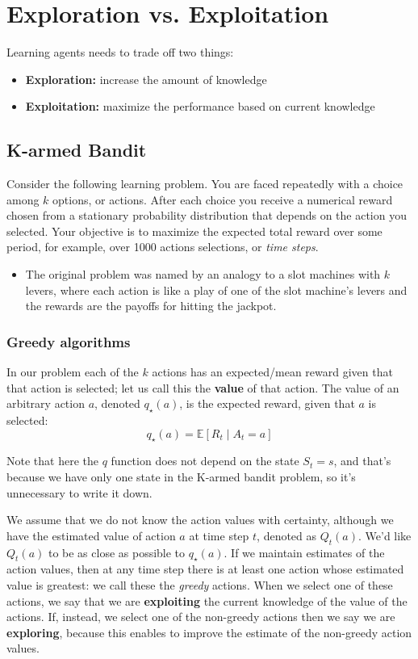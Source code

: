 \section{Exploration vs. Exploitation}
Learning agents needs to trade off two things:
\begin{itemize}
    \item \textbf{Exploration:} increase the amount of knowledge
    \item \textbf{Exploitation:} maximize the performance based on current knowledge
\end{itemize}

\subsection{K-armed Bandit}
Consider the following learning problem. You are faced repeatedly with a choice among $k$ options, or actions. After each choice you receive a numerical reward chosen from a stationary probability distribution that depends on the action you selected. Your objective is to maximize the expected total reward over some period, for example, over 1000 actions selections, or \textit{time steps}.
\begin{itemize}
    \item The original problem was named by an analogy to a slot machines with $k$ levers, where each action is like a play of one of the slot machine's levers and the rewards are the payoffs for hitting the jackpot.
\end{itemize}

\subsubsection{Greedy algorithms}\label{lab:greedy_algorithms}

In our problem each of the $k$ actions has an expected/mean reward given that that action is selected; let us call this the \textbf{value} of that action. The value of an arbitrary action $a$, denoted $q_\star (a)$, is the expected reward, given that $a$ is selected:
\[ 
    q_\star (a) = \mathbb{E}[R_t \mid A_t=a]
\]

Note that here the $q$ function does not depend on the state $S_t=s$, and that's because we have only one state in the K-armed bandit problem, so it's unnecessary to write it down.

We assume that we do not know the action values with certainty, although we have the estimated value of action $a$ at time step $t$, denoted as $Q_t(a)$. We'd like $Q_t(a)$ to be as close as possible to $q_\star (a)$. If we maintain estimates of the action values, then at any time step there is at least one action whose estimated value is greatest: we call these the \emph{greedy} actions. When we select one of these actions, we say that we are \textbf{exploiting} the current knowledge of the value of the actions. If, instead, we select one of the non-greedy actions then we say we are \textbf{exploring}, because this enables to improve the estimate of the non-greedy action values.


